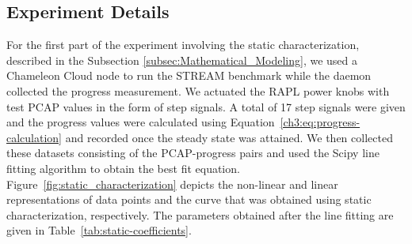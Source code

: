 \subsection{Experiment Details}\label{sec:exp_details}
For the first part of the experiment involving the static characterization, described in the Subsection \ref{subsec:Mathematical_Modeling}, we used a Chameleon Cloud node to run the STREAM benchmark while the daemon collected the progress measurement. We actuated the RAPL power knobs with test PCAP values in the form of step signals. A total of 17 step signals were given and the progress values were calculated using Equation~\ref{ch3:eq:progress-calculation} and recorded once the steady state was attained. We then collected these datasets consisting of the PCAP-progress pairs and used the Scipy line fitting algorithm to obtain the best fit equation. Figure~\ref{fig:static_characterization} depicts the non-linear and linear representations of data points and the curve that was obtained using static characterization, respectively. The parameters obtained after the line fitting are given in Table~\ref{tab:static-coefficients}.


